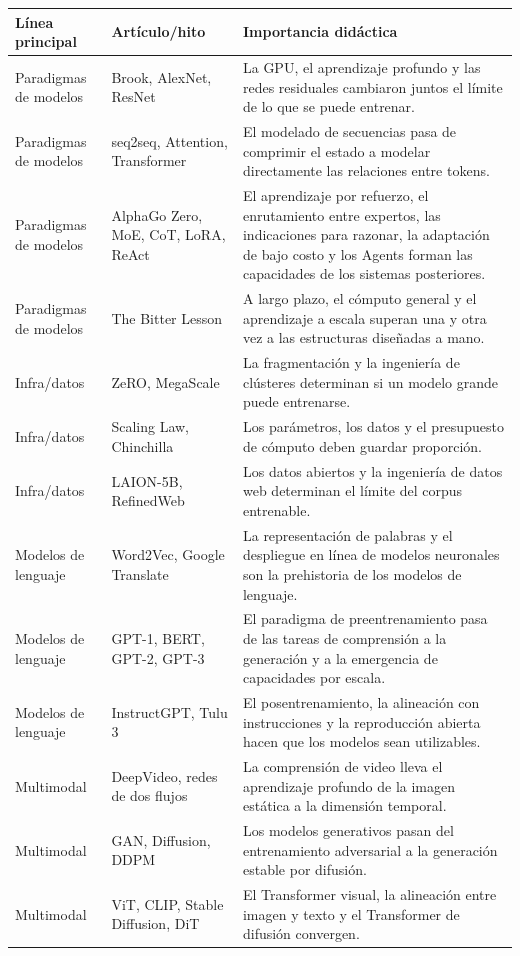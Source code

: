 \begin{longtable}{p{}p{}p{}}
\toprule
Línea principal & Artículo/hito & Importancia didáctica \\
\midrule
Paradigmas de modelos & Brook, AlexNet, ResNet & La GPU, el aprendizaje profundo y las redes residuales cambiaron juntos el límite de lo que se puede entrenar. \\
Paradigmas de modelos & seq2seq, Attention, Transformer & El modelado de secuencias pasa de comprimir el estado a modelar directamente las relaciones entre tokens. \\
Paradigmas de modelos & AlphaGo Zero, MoE, CoT, LoRA, ReAct & El aprendizaje por refuerzo, el enrutamiento entre expertos, las indicaciones para razonar, la adaptación de bajo costo y los Agents forman las capacidades de los sistemas posteriores. \\
Paradigmas de modelos & The Bitter Lesson & A largo plazo, el cómputo general y el aprendizaje a escala superan una y otra vez a las estructuras diseñadas a mano. \\
Infra/datos & ZeRO, MegaScale & La fragmentación y la ingeniería de clústeres determinan si un modelo grande puede entrenarse. \\
Infra/datos & Scaling Law, Chinchilla & Los parámetros, los datos y el presupuesto de cómputo deben guardar proporción. \\
Infra/datos & LAION-5B, RefinedWeb & Los datos abiertos y la ingeniería de datos web determinan el límite del corpus entrenable. \\
Modelos de lenguaje & Word2Vec, Google Translate & La representación de palabras y el despliegue en línea de modelos neuronales son la prehistoria de los modelos de lenguaje. \\
Modelos de lenguaje & GPT-1, BERT, GPT-2, GPT-3 & El paradigma de preentrenamiento pasa de las tareas de comprensión a la generación y a la emergencia de capacidades por escala. \\
Modelos de lenguaje & InstructGPT, Tulu 3 & El posentrenamiento, la alineación con instrucciones y la reproducción abierta hacen que los modelos sean utilizables. \\
Multimodal & DeepVideo, redes de dos flujos & La comprensión de video lleva el aprendizaje profundo de la imagen estática a la dimensión temporal. \\
Multimodal & GAN, Diffusion, DDPM & Los modelos generativos pasan del entrenamiento adversarial a la generación estable por difusión. \\
Multimodal & ViT, CLIP, Stable Diffusion, DiT & El Transformer visual, la alineación entre imagen y texto y el Transformer de difusión convergen. \\
\bottomrule
\end{longtable}

